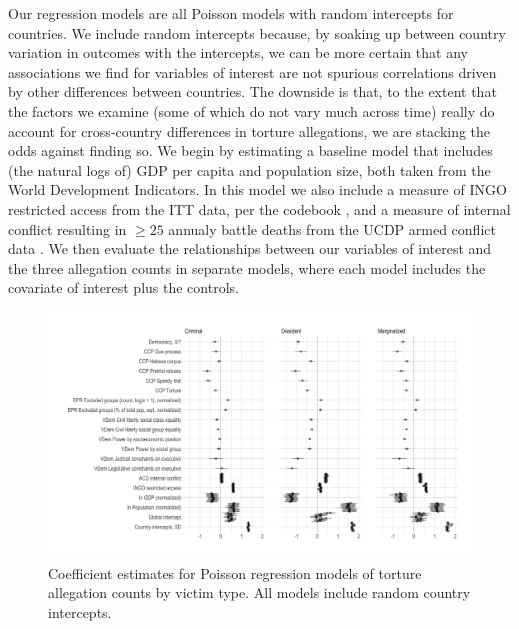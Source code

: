 \documentclass[11pt]{article}
\begin{document}
Our regression models are all Poisson models with random intercepts for countries. We include random intercepts 
because, by soaking up between country variation in outcomes with the intercepts, we can be more certain that any associations we find for variables of interest are not spurious correlations driven by other differences between countries. The downside is that, to the extent that the factors we examine (some of which do not vary much across time) really do account for cross-country differences in torture allegations, we are stacking the odds against finding so. 
We begin by estimating a baseline model that includes (the natural logs of) GDP per capita and population size, both taken from the World Development Indicators. In this model we also include a measure of INGO restricted access from the ITT data, per the codebook \citep[][p.\ 17]{ITTsaguide}, and a measure of internal conflict resulting in $\geq 25$ annualy battle deaths from the UCDP armed conflict data \citep{Themner2014}. We then evaluate the relationships between our variables of interest and the three allegation counts in separate models, where each model includes the covariate of interest plus the controls. 

\begin{figure}
\begin{center}
\caption{Coefficient estimates for Poisson regression models of torture allegation counts by victim type. All models include random country intercepts.}
\label{fig:coefs}
\includegraphics[width=.99\textwidth]{../output/figures/model-coefs.png}
\end{center}
\end{figure}
\end{document}
